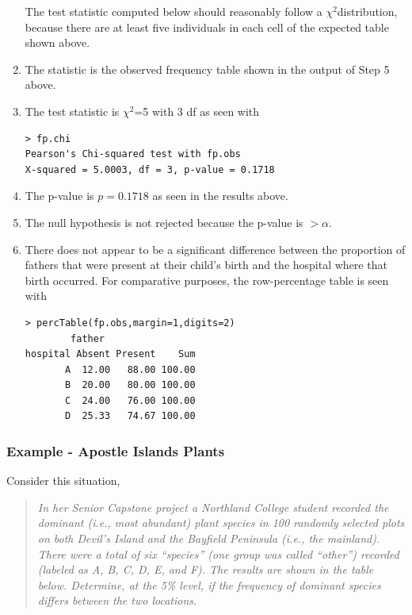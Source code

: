 \documentclass[10pt,openany]{book}\usepackage[]{graphicx}\usepackage[]{color}
\makeatletter
\newenvironment{kframe}{%
 \def\at@end@of@kframe{}%
 \ifinner\ifhmode%
  \def\at@end@of@kframe{\end{minipage}}%
  \begin{minipage}{\columnwidth}%
 \fi\fi%
 \def\FrameCommand##1{\hskip\@totalleftmargin \hskip-\fboxsep
 \colorbox{shadecolor}{##1}\hskip-\fboxsep
     \hskip-\linewidth \hskip-\@totalleftmargin \hskip\columnwidth}%
 \MakeFramed {\advance\hsize-\width
   \@totalleftmargin\z@ \linewidth\hsize
   \@setminipage}}%
 {\par\unskip\endMakeFramed%
 \at@end@of@kframe}
\newenvironment{knitrout}{}{} %
\makeatother
\begin{document}
\begin{enumerate}
\begin{knitrout}
\end{knitrout}
The test statistic computed below should reasonably follow a $\chi^{2}$distribution, because there are at least five individuals in each cell of the expected table shown above.
    \item The statistic is the observed frequency table shown in the output of Step 5 above.
    \item The test statistic is $\chi^{2}$=5 with 3 df as seen with
\begin{knitrout}
\color{fgcolor}\begin{kframe}
\begin{verbatim}
> fp.chi
Pearson's Chi-squared test with fp.obs 
X-squared = 5.0003, df = 3, p-value = 0.1718
\end{verbatim}
\end{kframe}
\end{knitrout}
    \item The p-value is $p=0.1718$ as seen in the results above.
    \item The null hypothesis is not rejected because the p-value is $>\alpha$.
    \item There does not appear to be a significant difference between the proportion of fathers that were present at their child's birth and the hospital where that birth occurred.  For comparative purposes, the row-percentage table is seen with
\begin{knitrout}
\color{fgcolor}\begin{kframe}
\begin{verbatim}
> percTable(fp.obs,margin=1,digits=2)
        father
hospital Absent Present    Sum
       A  12.00   88.00 100.00
       B  20.00   80.00 100.00
       C  24.00   76.00 100.00
       D  25.33   74.67 100.00
\end{verbatim}
\end{kframe}
\end{knitrout}
  \end{enumerate}

\subsubsection{Example - Apostle Islands Plants}
Consider this situation,
\begin{quote}
\textsl{In her Senior Capstone project a Northland College student recorded the dominant (i.e., most abundant) plant species in 100 randomly selected plots on both Devil's Island and the Bayfield Peninsula (i.e., the mainland).  There were a total of six ``species'' (one group was called ``other'') recorded (labeled as A, B, C, D, E, and F).  The results are shown in the table below.  Determine, at the 5\% level, if the frequency of dominant species differs between the two locations.}
\end{quote}
\end{document}
